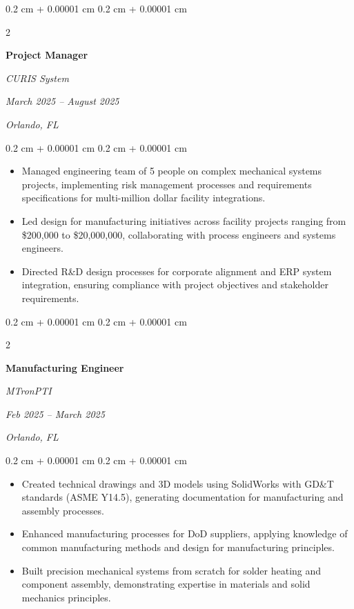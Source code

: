 \documentclass[10pt, letterpaper]{article}
\newenvironment{highlights}{
    \begin{itemize}[
        topsep=0.10 cm,
        parsep=0.10 cm,
        partopsep=0pt,
        itemsep=0pt,
        leftmargin=0.4 cm + 10pt
    ]
}{
    \end{itemize}
} %
\newenvironment{onecolentry}{
    \begin{adjustwidth}{
        0.2 cm + 0.00001 cm
    }{
        0.2 cm + 0.00001 cm
    }
}{
    \end{adjustwidth}
} %
\newenvironment{twocolentry}[2][]{
    \onecolentry
    \def\secondColumn{#2}
    \setcolumnwidth{\fill, 9.0 cm}
    \begin{paracol}{2}
}{
    \switchcolumn \raggedleft \secondColumn
    \end{paracol}
    \endonecolentry
} %
\begin{document}
        \vspace{0.35 cm}

        
        \begin{twocolentry}{
            \textit{March 2025 – August 2025}
            
            \textit{Orlando, FL}}
            \textbf{Project Manager}
            
            \textit{CURIS System}
        \end{twocolentry}

        \vspace{0.10 cm}
        \begin{onecolentry}
            \begin{highlights}
                \item Managed engineering team of 5 people on complex mechanical systems projects, implementing risk management processes and requirements specifications for multi-million dollar facility integrations.
                \item Led design for manufacturing initiatives across facility projects ranging from \$200,000 to \$20,000,000, collaborating with process engineers and systems engineers.
                \item Directed R\&D design processes for corporate alignment and ERP system integration, ensuring compliance with project objectives and stakeholder requirements.
            \end{highlights}
        \end{onecolentry}


        \vspace{0.35 cm}

        \begin{twocolentry}{
            \textit{Feb 2025 – March 2025}
            
            \textit{Orlando, FL}}
            \textbf{Manufacturing Engineer}
            
            \textit{MTronPTI}
        \end{twocolentry}

        \vspace{0.10 cm}
        \begin{onecolentry}
            \begin{highlights}
                \item Created technical drawings and 3D models using SolidWorks with GD\&T standards (ASME Y14.5), generating documentation for manufacturing and assembly processes.
                \item Enhanced manufacturing processes for DoD suppliers, applying knowledge of common manufacturing methods and design for manufacturing principles.
                \item Built precision mechanical systems from scratch for solder heating and component assembly, demonstrating expertise in materials and solid mechanics principles.
            \end{highlights}
        \end{onecolentry}
\end{document}
